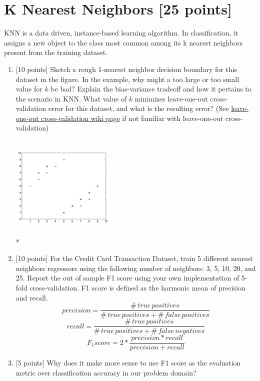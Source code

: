 \documentclass[letterpaper]{article}
\begin{document}
\section{K Nearest Neighbors [25 points]}

KNN is a data driven, instance-based learning algorithm. In classification, it assigns a new object to the class most common among its k nearest neighbors present from the training dataset. 

\begin{enumerate}

\item {[10 points]} Sketch a rough 1-nearest neighbor decision boundary for this dataset in the figure. In the example, why might a too large or too small value for $k$ be bad? Explain the bias-variance tradeoff and how it pertains to the scenario in KNN. What value of $k$ minimizes leave-one-out cross-validation error for this dataset, and what is the resulting error? (See \href{https://en.wikipedia.org/wiki/Cross-validation\_(statistics)\#Leave-one-out\_cross-validation}{leave-one-out cross-validation wiki page} if not familiar with leave-one-out cross-validation)

\begin{center}
\includegraphics[width=5cm,height=5cm,keepaspectratio]{knn.pdf} \\*
\end{center}



\item {[10 points]} For the Credit Card Transaction Dataset, train 5 different nearest neighbors regressors using the following number of neighbors: 3, 5, 10, 20, and 25. Report the out of sample F1 score using your own implementation of 5-fold cross-validation. F1 score is defined as the harmonic mean of precision and recall.
\[ precision = \frac{\# \, true \, positives}{\# \, true \, positives + \# \, false \, positives} \]
\[ recall = \frac{\# \, true \, positives}{\# \, true \, positives + \# \, false \, negatives} \]
\[ F_{1} score = 2 * \frac{precision * recall}{precision + recall} \]

\item {[5 points]} Why does it make more sense to use F1 score as the evaluation metric over classification accuracy in our problem domain?

\end{enumerate}
\end{document}
